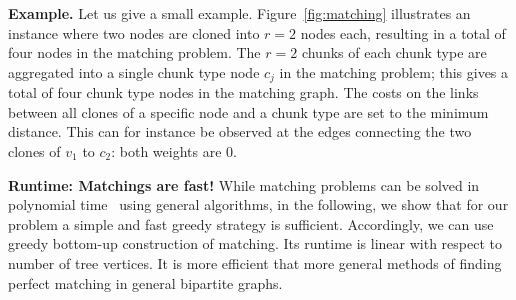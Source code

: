 \documentclass[9pt,twocolumn]{scrartcl}
\newcommand{\MaFactor}{r}
\newcommand{\RedundancyFactor}{\ensuremath{r}}
\newcommand{\VmChunkAssignment}{\mu}
\newcommand{\NodeMapping}{\pi}
\newcommand{\VirtualNode}{v}
\newcommand{\achunk}{\ensuremath{c}}
\newcommand{\RS}{\textsc{RS}}
\newcommand{\MA}{\textsc{MA}}
\begin{document}
\textbf{Example.} Let us give a small example.
%
%
%
Figure~\ref{fig:matching} illustrates 
an instance where two nodes are
cloned into $\MaFactor = 2$ nodes each, resulting in a total of four nodes in
the matching problem. 
The $\RedundancyFactor = 2$ chunks of each chunk type are
aggregated into a single chunk type node $\achunk_j$  in the matching problem;
this gives a total of four chunk type nodes in the matching graph. The costs
on the links between all clones of a specific node and a chunk type are set to
the minimum distance. This can for instance be observed at the edges connecting
the two clones of $\VirtualNode_1$ to $\achunk_2$: both weights are 0.

\textbf{Runtime: Matchings are fast!}
While matching problems can be solved in polynomial time~\cite{schrijver_combinatorial_optimization} using
general algorithms, in the following, we show that for our problem
a simple and fast greedy strategy is sufficient.
Accordingly, we can use greedy bottom-up construction of matching.
Its runtime is linear with respect to number of tree vertices. It is more efficient that more general methods of
finding perfect matching in general bipartite graphs.
\end{document}
